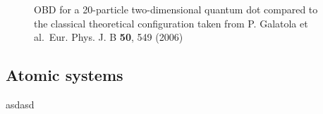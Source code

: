 \begin{frame}
 \begin{figure}
 \begin{center}
  \label{fig:wigner20}
  \caption{OBD for a 20-particle two-dimensional quantum dot compared to the classical theoretical configuration taken from P. Galatola et al.~Eur. Phys. J. B \textbf{50}, 549 (2006)}
 \end{center}
\end{figure}
\end{frame}


\subsection{Atomic systems}

\begin{frame}
 asdasd
\end{frame}













